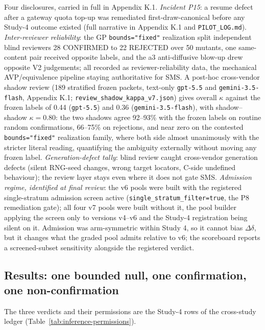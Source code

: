\documentclass[manuscript,screen,review]{acmart}
\begin{document}
Four disclosures, carried in full in Appendix K.1. \emph{Incident P15}: a
resume defect after a gateway quota top-up was remediated
first-draw-canonical before any Study-4 outcome existed (full narrative in
Appendix K.1 and \texttt{PILOT\_LOG.md}).
\emph{Inter-reviewer reliability}: the GP \texttt{bounds="fixed"} realization
split independent blind reviewers 28 CONFIRMED to 22 REJECTED over 50
mutants, one same-content pair received opposite labels, and the a3
anti-diffusive blow-up drew opposite V2 judgements; all recorded as
reviewer-reliability data, the mechanical AVP/equivalence pipeline staying
authoritative for SMS. A post-hoc cross-vendor shadow review (189 stratified
frozen packets, text-only \texttt{gpt-5.5} and \texttt{gemini-3.5-flash},
Appendix K.1; \texttt{review\_shadow\_kappa\_v7.json}) gives overall
\(\kappa\) against the frozen labels of 0.44 (\texttt{gpt-5.5}) and 0.36
(\texttt{gemini-3.5-flash}), with shadow--shadow \(\kappa = 0.80\): the two
shadows agree 92--93\% with the frozen labels on routine random
confirmations, 66--75\% on rejections, and near zero on the contested
\texttt{bounds="fixed"} realization family, where both side almost
unanimously with the stricter literal reading, quantifying the ambiguity
externally without moving any frozen label. \emph{Generation-defect tally}: blind review caught
cross-vendor generation defects (silent RNG-seed changes, wrong target
locators, C-side undefined behaviour); the review layer stays even where it
does not gate SMS. \emph{Admission regime, identified at final review}: the
v6 pools were built with the registered single-stratum admission screen
active (\texttt{single\_stratum\_filter=true}, the P8 remediation gate); all
four v7 pools were built without it, the pool builder applying the screen
only to versions v4--v6 and the Study-4 registration being silent on it.
Admission was arm-symmetric within Study 4, so it cannot bias
\(\Delta\delta\), but it changes what the graded pool admits relative to v6;
the scoreboard reports a screened-subset sensitivity alongside the registered
verdict.

\subsection{Results: one bounded null, one confirmation, one non-confirmation}\label{study4-scoreboard}

The three verdicts and their permissions are the Study-4 rows of the
cross-study ledger (Table~\ref{tab:inference-permissions}).
\end{document}
